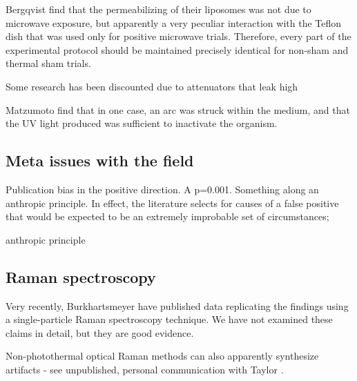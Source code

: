 \documentclass[paper.tex]{subfiles}
\begin{document}
\begin{multicols}{1}
Bergqvist \cite{Effect1994a} find that the permeabilizing of their liposomes was not due to microwave exposure, but apparently a very peculiar interaction with the Teflon dish that was used only for positive microwave trials. Therefore, every part of the experimental protocol should be maintained precisely identical for non-sham and thermal sham trials.

Some research has been discounted due to attenuators that leak high 

Matzumoto \cite{Inactivation1991} find that in one case, an arc was struck within the medium, and that the UV light produced was sufficient to inactivate the organism.


\subsection{Meta issues with the field}


Publication bias in the positive direction. A p=0.001. Something along an anthropic principle. In effect, the literature selects for causes of a false positive that would be expected to be an extremely improbable set of circumstances; 

anthropic principle


\subsection{Raman spectroscopy}

Very recently, Burkhartsmeyer \cite{Optical2020} have published data replicating the findings using a single-particle Raman spectroscopy technique. We have not examined these claims in detail, but they are good evidence.

Non-photothermal optical Raman methods can also apparently synthesize artifacts - see unpublished, personal communication with Taylor \cite{mechanisms1981}. 




























\end{multicols}
\end{document}
